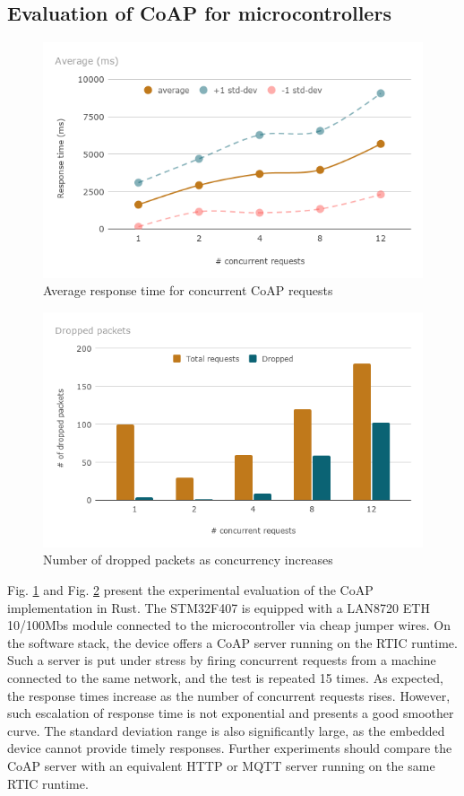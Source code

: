 \subsection{Evaluation of CoAP for microcontrollers}

\begin{figure}[h]
\centering
\includegraphics[width=\columnwidth]{figures/b-coap-1}
\caption{Average response time for concurrent CoAP requests \label{fig:b-coap-1}}
\end{figure}

\begin{figure}[h]
\centering
\includegraphics[width=\columnwidth]{figures/b-coap-2}
\caption{Number of dropped packets as concurrency increases \label{fig:b-coap-2}}
\end{figure}

Fig. \ref{fig:b-coap-1} and Fig. \ref{fig:b-coap-2} present the experimental evaluation of the CoAP implementation in Rust. The STM32F407 is equipped with a LAN8720 ETH 10/100Mbs module connected to the microcontroller via cheap jumper wires. On the software stack, the device offers a CoAP server running on the RTIC runtime. Such a server is put under stress by firing concurrent requests from a machine connected to the same network, and the test is repeated 15 times. As expected, the response times increase as the number of concurrent requests rises. However, such escalation of response time is not exponential and presents a good smoother curve. The standard deviation range is also significantly large, as the embedded device cannot provide timely responses. Further experiments should compare the CoAP server with an equivalent HTTP or MQTT server running on the same RTIC runtime.

